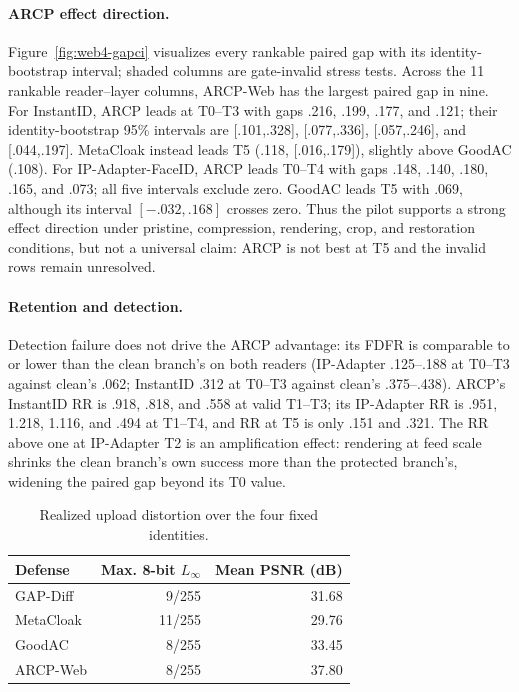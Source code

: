 \paragraph{ARCP effect direction.}
Figure~\ref{fig:web4-gapci} visualizes every rankable paired gap with its
identity-bootstrap interval; shaded columns are gate-invalid stress tests.
Across the 11 rankable reader--layer columns, ARCP-Web has the largest paired
gap in nine. For InstantID, ARCP leads at T0--T3 with gaps .216, .199, .177,
and .121; their identity-bootstrap 95\% intervals are [.101,.328],
[.077,.336], [.057,.246], and [.044,.197]. MetaCloak instead leads T5 (.118,
[.016,.179]), slightly above GoodAC (.108). For IP-Adapter-FaceID, ARCP leads T0--T4 with gaps .148, .140,
.180, .165, and .073; all five intervals exclude zero. GoodAC leads T5 with
.069, although its interval $[-.032,.168]$ crosses zero. Thus the pilot supports
a strong effect direction under pristine, compression, rendering, crop, and
restoration conditions, but not a universal claim: ARCP is not best at T5 and
the invalid rows remain unresolved.

\paragraph{Retention and detection.}
Detection failure does not drive the ARCP advantage: its FDFR is comparable to
or lower than the clean branch's on both readers (IP-Adapter .125--.188 at
T0--T3 against clean's .062; InstantID .312 at T0--T3 against clean's
.375--.438). ARCP's InstantID RR is .918, .818, and .558 at valid T1--T3; its
IP-Adapter RR is .951, 1.218, 1.116, and .494 at T1--T4, and RR at T5 is only
.151 and .321. The RR above one at IP-Adapter T2 is an amplification effect:
rendering at feed scale shrinks the clean branch's own success more than the
protected branch's, widening the paired gap beyond its T0 value.

\begin{table}[t]
\centering
\caption{Realized upload distortion over the four fixed identities.}
\label{tab:web4-quality}
\small
\begin{tabular}{lrr}
\toprule
Defense & Max. 8-bit $L_\infty$ & Mean PSNR (dB) \\
\midrule
GAP-Diff & 9/255 & 31.68 \\
MetaCloak & 11/255 & 29.76 \\
GoodAC & 8/255 & 33.45 \\
ARCP-Web & 8/255 & 37.80 \\
\bottomrule
\end{tabular}
\end{table}

